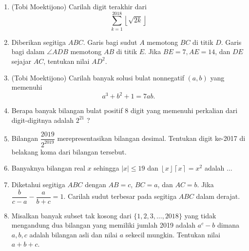 \documentclass[11pt]{scrartcl}
\begin{document}
\begin{enumerate}
	\item (Tobi Moektijono)
	Carilah digit terakhir dari $$\sum_{k=1}^{2018} \left \lfloor \sqrt{2k} \right \rfloor $$
	
	\item Diberikan segitiga $ABC$. Garis bagi sudut $A$ memotong $BC$ di titik $D$. Garis bagi
	dalam $\angle ADB$ memotong $AB$ di titik $E$. Jika $BE = 7, AE = 14$, dan $DE$ sejajar $AC$,
	tentukan nilai $AD^2$.
	
	\item (Tobi Moektijono)
	Carilah banyak solusi bulat nonnegatif $(a,b)$ yang memenuhi $$a^3+b^2+1=7ab.$$
	
	\item
	Berapa banyak bilangan bulat positif 8 digit yang memenuhi perkalian dari digit-digitnya adalah $2^{21}$
	?
	
	\item Bilangan $\dfrac{2019}{2^{2019}}$ merepresentasikan bilangan desimal. Tentukan digit ke-2017 di belakang koma dari bilangan tersebut.
	
	\item Banyaknya bilangan real $x$ sehingga $|x| \le 19$ dan $\left \lfloor x \right \rfloor\left \lceil x \right \rceil = x^2$ adalah $\dots$
	
	\item Diketahui segitiga $ABC$ dengan $AB=c$, $BC=a$, dan $AC=b$. Jika $\dfrac{b}{c-a} - \dfrac{a}{b+c} = 1$. Carilah sudut terbesar pada segitiga $ABC$ dalam derajat.
	
	\item
	Misalkan banyak subset tak kosong dari $\{1,2,3,\dots,2018\}$ yang tidak mengandung dua bilangan yang memiliki jumlah 2019 adalah $a^c-b$ dimana $a,b,c$ adalah bilangan asli dan nilai $a$ sekecil mungkin. Tentukan nilai $a+b+c$.
\end{enumerate}
\end{document}
